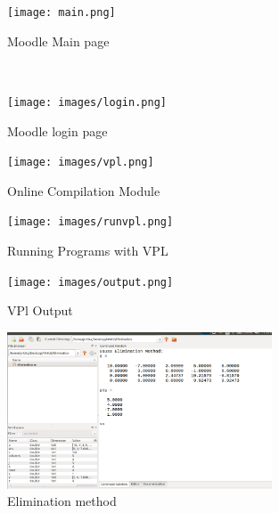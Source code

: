 
\begin{figure}[!ht]
	\centering
	\texttt{[image: main.png]}                
	\caption{Moodle Main page}
	\hspace{-1.5em}
\end{figure}\\


\begin{figure}[!ht]
	\centering
	\texttt{[image: images/login.png]}                
	\caption{Moodle login page}
	\hspace{-1.5em}
\end{figure}
\newpage

\begin{figure}[!ht]
	\centering
	\texttt{[image: images/vpl.png]}                
	\caption{Online Compilation Module}
	\hspace{-1.5em}
\end{figure}

\begin{figure}[!ht]
	\centering
	\texttt{[image: images/runvpl.png]}                
	\caption{Running Programs with VPL}
	\hspace{-1.5em}
\end{figure}
\newpage
 \begin{figure}[!ht]
 	\centering
 	\texttt{[image: images/output.png]}                
 	\caption{VPl Output}
 	\hspace{-1.5em}
 \end{figure}
 
  \begin{figure}[!ht]
  	\centering
  	\includegraphics[width=0.7\textwidth]{images/Elimination.png}                
  	\caption{Elimination method }
  	\hspace{-1.5em}
  \end{figure}
  
